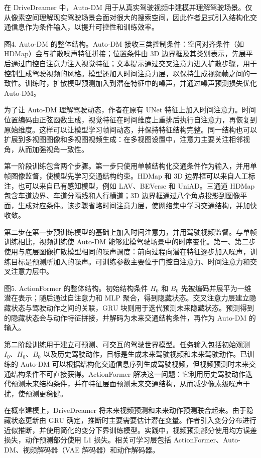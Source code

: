 \documentclass[10pt]{article}
\begin{document}
在 DriveDreamer 中，Auto-DM 用于从真实驾驶视频中建模并理解驾驶场景。仅从像素空间理解现实驾驶场景会面对很大的搜索空间，因此作者显式引入结构化交通信息作为条件输入，以提升可控性和训练效率。

图4. Auto-DM 的整体结构。Auto-DM 接收三类控制条件：空间对齐条件（如 HDMap）会与扩散噪声特征拼接；位置条件由 3D 边界框及其类别表示，先展平后通过门控自注意力注入视觉特征；文本提示通过交叉注意力进入扩散步骤，用于控制生成驾驶视频的风格。模型还加入时间注意力层，以保持生成视频帧之间的一致性。训练时，扩散模型预测加入到潜在特征中的噪声，并通过噪声预测损失优化 Auto-DM。

为了让 Auto-DM 理解驾驶动态，作者在原有 UNet 特征上加入时间注意力。时间位置编码由正弦函数生成，视觉特征在时间维度上重排后执行自注意力，再恢复到原始维度。这样可以让模型学习帧间动态，并保持特征结构完整。同一结构也可以扩展到多视图图像和多视图视频生成：在多视图设置中，注意力主要关注相邻视角，从而加强视角一致性。

第一阶段训练包含两个步骤。第一步只使用单帧结构化交通条件作为输入，并用单帧图像监督，使模型先学习交通结构约束。HDMap 和 3D 边界框可以来自人工标注，也可以来自已有感知模型，例如 LAV、BEVerse 和 UniAD。三通道 HDMap 包含车道边界、车道分隔线和人行横道；3D 边界框通过八个角点投影到图像平面，生成对应条件。该步骤省略时间注意力层，使网络集中学习交通结构，并加快收敛。

第二步在第一步预训练模型的基础上加入时间注意力，并用驾驶视频监督。与单帧训练相比，视频训练使 Auto-DM 能够建模驾驶场景中的时序变化。第一、第二步使用与底层图像扩散模型相同的噪声调度：前向过程向潜在特征逐步加入噪声，训练目标是预测所加入的噪声。可训练参数主要位于门控自注意力、时间注意力和交叉注意力层中。

图5. ActionFormer 的整体结构。初始结构条件 $H_0$ 和 $B_0$ 先被编码并展平为一维潜在表示；随后通过自注意力和 MLP 聚合，得到隐藏状态。交叉注意力层建立隐藏状态与驾驶动作之间的关联，GRU 块则用于迭代预测未来隐藏状态。预测得到的隐藏状态会与动作特征拼接，并解码为未来交通结构条件，再作为 Auto-DM 的输入。

第二阶段训练用于建立可预测、可交互的驾驶世界模型。任务输入包括初始观测 $I_0$、$H_0$、$B_0$ 以及历史驾驶动作，目标是生成未来驾驶视频和未来驾驶动作。已训练的 Auto-DM 可以根据结构化交通信息序列生成驾驶视频，但视频预测时未来交通结构条件不可直接获得。ActionFormer 解决这一问题：它利用历史驾驶动作迭代预测未来结构条件，并在特征层面预测未来交通结构，从而减少像素级噪声干扰，使预测更稳健。

在概率建模上，DriveDreamer 将未来视频预测和未来动作预测联合起来。由于隐藏状态更新由 GRU 确定，推断时主要需要估计潜在变量。作者引入变分分布进行近似推断，并使用简化的变分下界训练模型。实践中，视频预测部分使用均方误差损失，动作预测部分使用 L1 损失。相关可学习层包括 ActionFormer、Auto-DM、视频解码器（VAE 解码器）和动作解码器。
\end{document}
